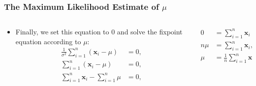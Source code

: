 \begin{frame}
	\frametitle{The Maximum Likelihood Estimate of $\mu$}
	\begin{columns}
		\begin{column}{0.5\textwidth}
			\begin{itemize}
				\item Finally, we set this equation to $0$ and solve the fixpoint equation according to $\mu$:
				      \begin{align}
					      \frac{1}{\sigma^2} \sum_{i=1}^{n} (\mathbf{x}_i-\mu) & = 0, \\
					      \sum_{i=1}^{n} (\mathbf{x}_i-\mu)                    & = 0, \\
					      \sum_{i=1}^{n} \mathbf{x}_i- \sum_{i=1}^{n} \mu      & = 0,
				      \end{align}
			\end{itemize}
		\end{column}
		\begin{column}{0.5\textwidth}
			\centering
			\begin{align}
				0     & = \sum_{i=1}^{n} \mathbf{x}_i- n \mu ,    \\
				n \mu & = \sum_{i=1}^{n} \mathbf{x}_i,            \\
				\mu   & = \frac{1}{n} \sum_{i=1}^{n}\mathbf{x}_i.
			\end{align}
		\end{column}
	\end{columns}
\end{frame}


